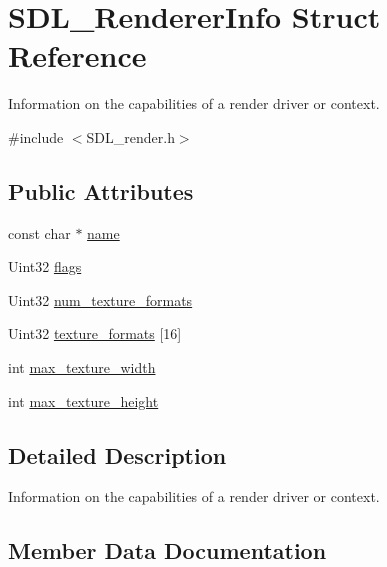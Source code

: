 \hypertarget{structSDL__RendererInfo}{}\section{S\+D\+L\+\_\+\+Renderer\+Info Struct Reference}
\label{structSDL__RendererInfo}


Information on the capabilities of a render driver or context.  




{\ttfamily \#include $<$S\+D\+L\+\_\+render.\+h$>$}

\subsection*{Public Attributes}
\begin{DoxyCompactItemize}
\item 
const char $\ast$ \hyperlink{structSDL__RendererInfo_a433ecb2865c81ba9f28038e56a4ae6f3}{name}
\item 
Uint32 \hyperlink{structSDL__RendererInfo_a95cf0ffd1704fd0a4dd8ceac6c9f0542}{flags}
\item 
Uint32 \hyperlink{structSDL__RendererInfo_acdec165b2053b914313f5996983ec6b8}{num\+\_\+texture\+\_\+formats}
\item 
Uint32 \hyperlink{structSDL__RendererInfo_a88450f9d48e593ec4571e3ba7cc3427d}{texture\+\_\+formats} \mbox{[}16\mbox{]}
\item 
int \hyperlink{structSDL__RendererInfo_a6e6757e3d5c1f0922adaba39380edfa6}{max\+\_\+texture\+\_\+width}
\item 
int \hyperlink{structSDL__RendererInfo_a87c6a13e8d535c2148f8913c05e13102}{max\+\_\+texture\+\_\+height}
\end{DoxyCompactItemize}


\subsection{Detailed Description}
Information on the capabilities of a render driver or context. 

\subsection{Member Data Documentation}
\mbox{\label{structSDL__RendererInfo_a95cf0ffd1704fd0a4dd8ceac6c9f0542}} 
